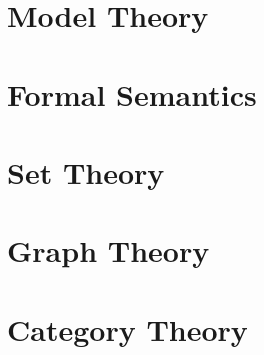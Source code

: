 \documentclass{article}
\begin{document}

\part{Model Theory}


\part{Formal Semantics}


\part{Set Theory}


\part{Graph Theory}


\part{Category Theory}

\end{document}
